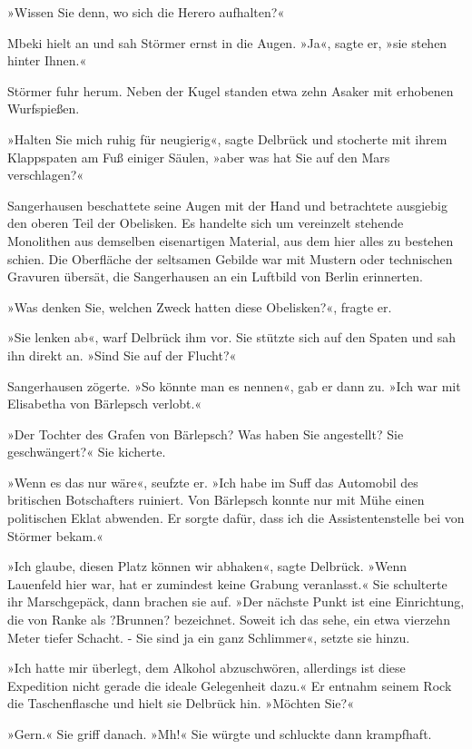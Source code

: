 »Wissen Sie denn, wo sich die Herero aufhalten?«

Mbeki hielt an und sah Störmer ernst in die Augen. »Ja«, sagte er,
»sie stehen hinter Ihnen.«

Störmer fuhr herum. Neben der Kugel standen etwa zehn Asaker mit
erhobenen Wurfspießen.

\bigpar

»Halten Sie mich ruhig für neugierig«, sagte Delbrück und stocherte
mit ihrem Klappspaten am Fuß einiger Säulen, »aber was hat Sie auf
den Mars verschlagen?«

Sangerhausen beschattete seine Augen mit der Hand und betrachtete
ausgiebig den oberen Teil der Obelisken. Es handelte sich um
vereinzelt stehende Monolithen aus demselben eisenartigen Material,
aus dem hier alles zu bestehen schien. Die Oberfläche der seltsamen
Gebilde war mit Mustern oder technischen Gravuren übersät, die
Sangerhausen an ein Luftbild von Berlin erinnerten.

»Was denken Sie, welchen Zweck hatten diese Obelisken?«, fragte
er.

»Sie lenken ab«, warf Delbrück ihm vor. Sie stützte sich auf den
Spaten und sah ihn direkt an. »Sind Sie auf der Flucht?«

Sangerhausen zögerte. »So könnte man es nennen«, gab er dann zu.
»Ich war mit Elisabetha von Bärlepsch verlobt.«

»Der Tochter des Grafen von Bärlepsch? Was haben Sie angestellt?
Sie geschwängert?« Sie kicherte.

»Wenn es das nur wäre«, seufzte er. »Ich habe im Suff das Automobil
des britischen Botschafters ruiniert. Von Bärlepsch konnte nur mit
Mühe einen politischen Eklat abwenden. Er sorgte dafür, dass ich
die Assistentenstelle bei von Störmer bekam.«

»Ich glaube, diesen Platz können wir abhaken«, sagte Delbrück.
»Wenn Lauenfeld hier war, hat er zumindest keine Grabung
veranlasst.« Sie schulterte ihr Marschgepäck, dann brachen sie auf.
»Der nächste Punkt ist eine Einrichtung, die von Ranke als
?Brunnen? bezeichnet. Soweit ich das sehe, ein etwa vierzehn Meter
tiefer Schacht. - Sie sind ja ein ganz Schlimmer«, setzte sie
hinzu.

»Ich hatte mir überlegt, dem Alkohol abzuschwören, allerdings ist
diese Expedition nicht gerade die ideale Gelegenheit dazu.« Er
entnahm seinem Rock die Taschenflasche und hielt sie Delbrück hin.
»Möchten Sie?«

»Gern.« Sie griff danach. »Mh!« Sie würgte und schluckte dann
krampfhaft.

